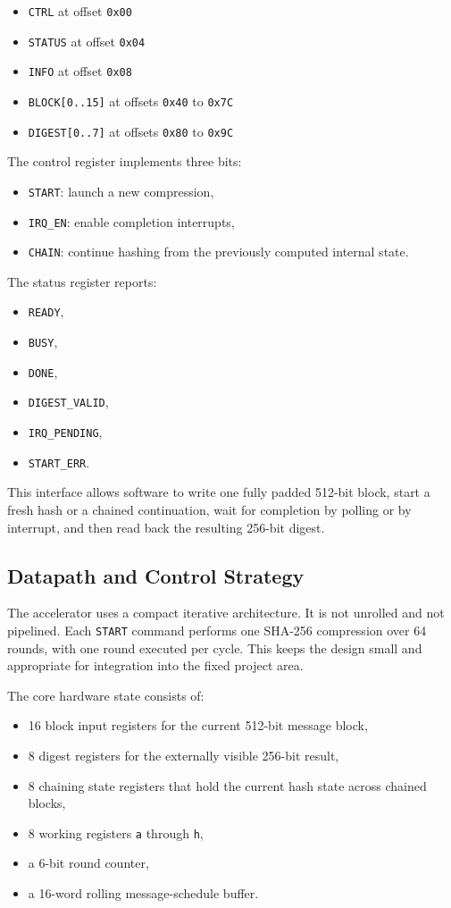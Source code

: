 \documentclass[11pt,a4paper]{article}
\begin{document}
\begin{itemize}
  \item \texttt{CTRL} at offset \texttt{0x00}
  \item \texttt{STATUS} at offset \texttt{0x04}
  \item \texttt{INFO} at offset \texttt{0x08}
  \item \texttt{BLOCK[0..15]} at offsets \texttt{0x40} to \texttt{0x7C}
  \item \texttt{DIGEST[0..7]} at offsets \texttt{0x80} to \texttt{0x9C}
\end{itemize}

The control register implements three bits:
\begin{itemize}
  \item \texttt{START}: launch a new compression,
  \item \texttt{IRQ\_EN}: enable completion interrupts,
  \item \texttt{CHAIN}: continue hashing from the previously computed internal
  state.
\end{itemize}

The status register reports:
\begin{itemize}
  \item \texttt{READY},
  \item \texttt{BUSY},
  \item \texttt{DONE},
  \item \texttt{DIGEST\_VALID},
  \item \texttt{IRQ\_PENDING},
  \item \texttt{START\_ERR}.
\end{itemize}

This interface allows software to write one fully padded 512-bit block, start a
fresh hash or a chained continuation, wait for completion by polling or by
interrupt, and then read back the resulting 256-bit digest.

\subsection{Datapath and Control Strategy}
The accelerator uses a compact iterative architecture. It is not unrolled and
not pipelined. Each \texttt{START} command performs one SHA-256 compression over
64 rounds, with one round executed per cycle. This keeps the design small and
appropriate for integration into the fixed project area.

The core hardware state consists of:
\begin{itemize}
  \item 16 block input registers for the current 512-bit message block,
  \item 8 digest registers for the externally visible 256-bit result,
  \item 8 chaining state registers that hold the current hash state across
  chained blocks,
  \item 8 working registers \texttt{a} through \texttt{h},
  \item a 6-bit round counter,
  \item a 16-word rolling message-schedule buffer.
\end{itemize}
\end{document}
